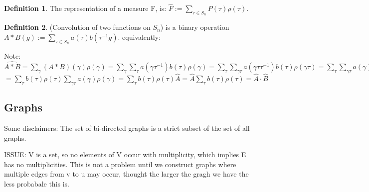 \documentclass{article}
\theoremstyle{definition}
\newtheorem{definition}{Definition}
\begin{document}
\begin{definition}The representation of a measure F, is: $ \hat{F} := \sum_{\tau \in S_n} P(\tau) \rho(\tau) $. \end{definition}

\begin{definition}(Convolution of two functions on $S_n$) is a binary operation $ A * B (g) := \sum_{\tau \in S_n} a(\tau) b(\tau^{-1}g) $. equivalently:
\end{definition}

Note: $ \widehat{A*B} = \sum_{\gamma} (A*B)(\gamma)\rho(\gamma) 
= \sum_{\gamma } \sum_{\tau} a(\gamma \tau^{-1})b(\tau)\rho(\gamma )
= \sum_{\tau} \sum_{\gamma\tau } a(\gamma\tau \tau^{-1})b(\tau)\rho(\gamma\tau )
= \sum_{\tau} \sum_{\gamma\tau } a(\gamma )b(\tau)\rho(\gamma)\rho(\tau ) $
$ = \sum_{\tau} b(\tau)\rho(\tau ) \sum_{\gamma\tau } a(\gamma )\rho(\gamma) 
= \sum_{\tau} b(\tau)\rho(\tau ) \hat{A}
= \hat{A} \sum_{\tau} b(\tau)\rho(\tau )
= \hat{A} \cdot \hat{B} $
\subsection{Graphs}
Some disclaimers:
The set of bi-directed graphs is a strict subset of the set of all graphs. 

ISSUE: V is a set, so no elements of V occur with multiplicity, which implies E has no multiplicities. This is not a problem until we construct graphs where multiple edges from v to u may occur, thought the larger the gragh we have the less probabale this is.
\end{document}
